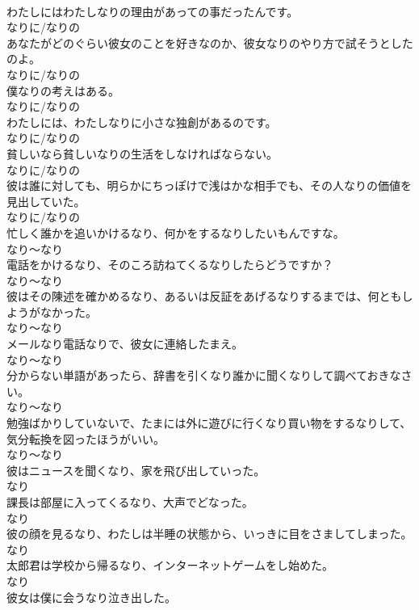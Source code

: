 \documentclass[8pt]{extreport}
\begin{document}
\begin{CJK}{UTF8}{min}
\\	わたしにはわたしなりの理由があっての事だったんです。	
\\	なりに/なりの
\\	あなたがどのぐらい彼女のことを好きなのか、彼女なりのやり方で試そうとしたのよ。	
\\	なりに/なりの
\\	僕なりの考えはある。	
\\	なりに/なりの
\\	わたしには、わたしなりに小さな独創があるのです。	
\\	なりに/なりの
\\	貧しいなら貧しいなりの生活をしなければならない。	
\\	なりに/なりの
\\	彼は誰に対しても、明らかにちっぽけで浅はかな相手でも、その人なりの価値を見出していた。	
\\	なりに/なりの
\\	忙しく誰かを追いかけるなり、何かをするなりしたいもんですな。	
\\	なり～なり
\\	電話をかけるなり、そのころ訪ねてくるなりしたらどうですか？	
\\	なり～なり
\\	彼はその陳述を確かめるなり、あるいは反証をあげるなりするまでは、何ともしようがなかった。	
\\	なり～なり
\\	メールなり電話なりで、彼女に連絡したまえ。	
\\	なり～なり
\\	分からない単語があったら、辞書を引くなり誰かに聞くなりして調べておきなさい。	
\\	なり～なり
\\	勉強ばかりしていないで、たまには外に遊びに行くなり買い物をするなりして、気分転換を図ったほうがいい。	
\\	なり～なり
\\	彼はニュースを聞くなり、家を飛び出していった。	
\\	なり
\\	課長は部屋に入ってくるなり、大声でどなった。	
\\	なり
\\	彼の顔を見るなり、わたしは半睡の状態から、いっきに目をさましてしまった。	
\\	なり
\\	太郎君は学校から帰るなり、インターネットゲームをし始めた。	
\\	なり
\\	彼女は僕に会うなり泣き出した。	

\end{CJK}
\end{document}
